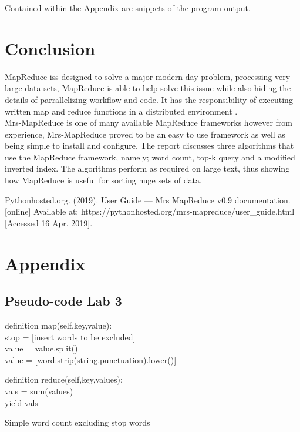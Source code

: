 \documentclass[11pt,journal]{article}
\begin{document}
Contained within the Appendix are snippets of the program output.
\newline

\section{Conclusion}

MapReduce iss designed to solve a major modern day problem, processing very large data sets, MapReduce is able to help solve this issue while also hiding the details of parrallelizing workflow and code. It has the  responsibility of executing written map and reduce functions in a distributed environment .\\
Mrs-MapReduce is one of many available MapReduce frameworks however from experience, Mrs-MapReduce proved to be an easy to use framework as well as being simple to install and configure. The report discusses three algorithms that use the MapReduce framework, namely; word count, top-k query and a modified inverted index. The algorithms perform as required on large text, thus showing how MapReduce is useful for sorting huge sets of data.


\justify

\begin{thebibliography}{9}
 Pythonhosted.org. (2019). User Guide — Mrs MapReduce v0.9 documentation. [online] Available at: https://pythonhosted.org/mrs-mapreduce/user\_guide.html [Accessed 16 Apr. 2019].



\end{thebibliography}


\appendix
\newpage
\section{Appendix}
\subsection{Pseudo-code Lab 3}
\begin{algorithm}[H]
\SetAlgoLined

definition map(self,key,value):\\
stop = [insert words to be excluded]\\
value = value.split()\\
value = [word.strip(string.punctuation).lower()]\\
\vspace{5pt}

\vspace{5pt}
definition reduce(self,key,values):\\
vals = sum(values)\\
yield vals


\caption{ Simple word count excluding stop words}
\end{algorithm}
\end{document}
